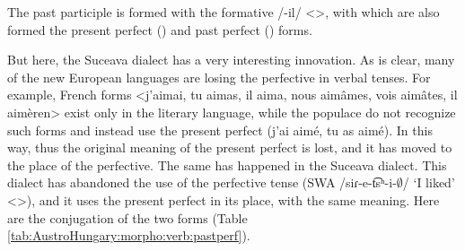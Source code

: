 

The past participle is formed with the formative /-il/ <>,  with which are also formed the present perfect () and past perfect () forms. 


But here, the Suceava dialect has a very interesting innovation. As is clear, many of the new European languages are losing the perfective in verbal tenses. For example, French forms <j'aimai, tu aimas, il aima, nous aimâmes, vois aimâtes, il aimèren> exist only in the literary language, while the populace do not recognize such forms and instead use the present perfect (j'ai aimé, tu as aimé). In this way, thus the original meaning of the present perfect is lost, and it has moved to the place of the perfective. The same has happened in the Suceava dialect. This dialect has abandoned the use of the perfective tense (SWA /siɾ-e-t͡sʰ-i-$\emptyset$/ `I liked' <>), and it uses the present perfect in its place, with the same meaning. Here are the conjugation of the two forms (Table \ref{tab:AustroHungary:morpho:verb:pastperf}). 

